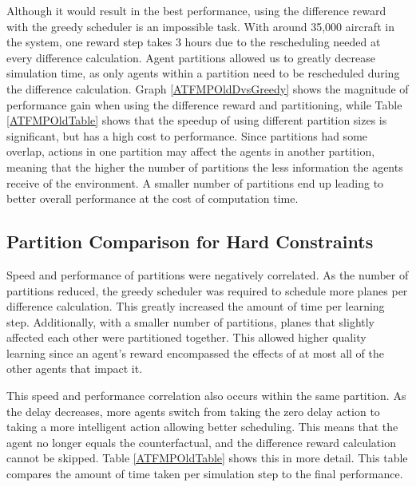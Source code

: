 \documentclass{aamas2014}
\begin{document}
Although it would result in the best performance, using the difference reward with the greedy scheduler is an impossible task. With around 35,000 aircraft in the system, one reward step takes 3 hours due to the rescheduling needed at every difference calculation. Agent partitions allowed us to greatly decrease simulation time, as only agents within a partition need to be rescheduled during the difference calculation. Graph \ref{ATFMPOldDvsGreedy} shows the magnitude of performance gain when using the difference reward and partitioning, while Table \ref{ATFMPOldTable} shows that the speedup of using different partition sizes is significant, but has a high cost to performance. Since partitions had some overlap, actions in one partition may affect the agents in another partition, meaning that the higher the number of partitions the less information the agents receive of the environment. A smaller number of partitions end up leading to better overall performance at the cost of computation time.

\subsection{Partition Comparison for Hard Constraints}
Speed and performance of partitions were negatively correlated. As the number of partitions reduced, the greedy scheduler was required to schedule more planes per difference calculation. This greatly increased the amount of time per learning step. Additionally, with a smaller number of partitions, planes that slightly affected each other were partitioned together. This allowed higher quality learning since an agent's reward encompassed the effects of at most all of the other agents that impact it. 

This speed and performance correlation also occurs within the same partition. As the delay decreases, more agents switch from taking the zero delay action to taking a more intelligent action allowing better scheduling. This means that the agent no longer equals the counterfactual, and the difference reward calculation cannot be skipped. Table \ref{ATFMPOldTable} shows this in more detail. This table compares the amount of time taken per simulation step to the final performance.
\end{document}
